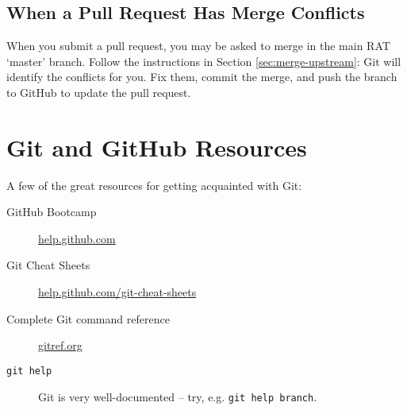 \documentclass{article}
\begin{document}
\subsection{When a Pull Request Has Merge Conflicts}
When you submit a pull request, you may be asked to merge in the main RAT
`master' branch. Follow the instructions in Section \ref{sec:merge-upstream}:
Git will identify the conflicts for you. Fix them, commit the merge, and
push the branch to GitHub to update the pull request.

\section{Git and GitHub Resources}
A few of the great resources for getting acquainted with Git:
\begin{description}
\item[GitHub Bootcamp] \href{http://help.github.com}{help.github.com}
\item[Git Cheat Sheets] \href{http://help.github.com/git-cheat-sheets}{help.github.com/git-cheat-sheets}
\item[Complete Git command reference] \href{http://gitref.org}{gitref.org}
\item[{\tt git help}] Git is very well-documented -- try, e.g. {\tt git help branch}.
\end{description}
\end{document}
